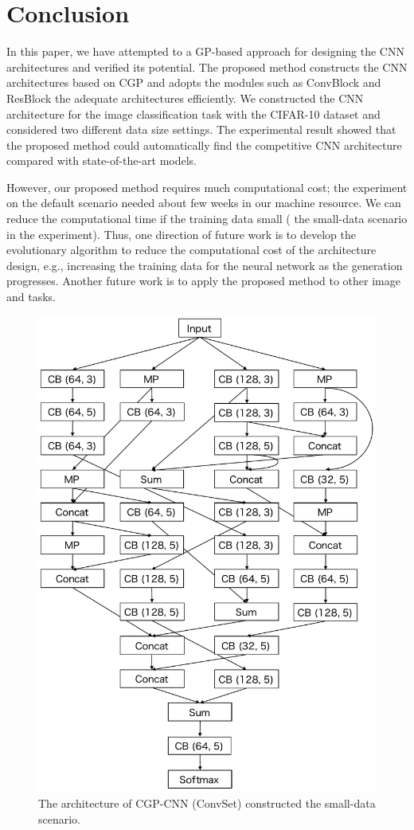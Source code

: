 \section{Conclusion}
In this paper, we have attempted to  a GP-based approach for designing the CNN architectures and  verified its potential.
The proposed method constructs the CNN architectures based on CGP and adopts the  modules\new{,} such as ConvBlock and ResBlock\new{,}  the adequate architectures efficiently.
We  constructed the CNN architecture for the image classification task with the CIFAR-10 dataset and considered two different data size settings. The experimental result showed that the proposed method could automatically find the competitive CNN architecture compared with  state-of-the-art models.

However, our proposed method requires much computational cost; the experiment on the default scenario needed about  few weeks in our machine resource. We can reduce the computational time if the training data  small ( the small-data scenario in the experiment). Thus, one direction of future work is to develop the evolutionary algorithm to reduce the computational cost of the architecture design, e.g., increasing the training data for the neural network as the generation progresses. Another future work is to apply the proposed method to other image  and tasks.

\begin{figure}[t]
\includegraphics[width=0.9\linewidth, bb=0 0 575 810]{images/model_small.pdf}
\caption{The architecture of CGP-CNN (ConvSet) constructed  the small-data scenario.}
\label{model_small}
\end{figure}

